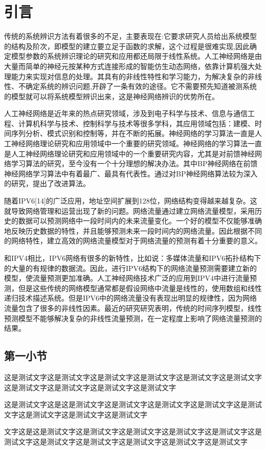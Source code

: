 \documentclass[UTF8]{ctexart}
\begin{document}
\tableofcontents\thispagestyle{empty}
\newpage
\setcounter{page}{1}
\section{引言}
传统的系统辨识方法有着很多的不足，主要表现在:它要求研究人员给出系统模型的结构及阶次，即模型的建立要立足于函数的求解，这个过程是很难实现,因此确定模型参数的系统辨识理论的研究和应用都还局限于线性系统。人工神经网络是由大量而简单的神经元按某种方式连接形成的智能仿生动态网络，依靠计算机强大处理能力来实现对信息的处理。其具有的非线性特性和学习能力，为解决复杂的非线性、不确定系统的辨识问题,开辟了一条有效的途径。它不需要预先知道被测系统的模型就可以将系统模型辨识出来，这是神经网络辨识的优势所在。

人工神经网络是近年来的热点研究领域，涉及到电子科学与技术、信息与通信工程、计算机科学与技术、控制科学与技术等很多学科，其应用领域包括：建模、时间序列分析、模式识别和控制等，并在不断的拓展。神经网络的学习算法一直是人工神经网络理论研究和应用领域中一个重要的研究领域。神经网络的学习算法一直是人工神经网络理论研究和应用领域中的一个重要研究内容，尤其是对前馈神经网络学习算法的研究，至今没有一个十分理想的解决办法。其中BP神经网络在前馈神经网络学习算法中有着最广、最具有代表性。通过对BP神经网络算法较为深入的研究，提出了改进算法。

随着IPV6[14]的广泛应用，地址空间扩展到128位，网络结构变得越来越复杂。这就导致网络管理和运营出现了新的问题。网络流量通过建立网络流量模型，采用历史的数据可以预测网络中一段时间内的未来流量变化。一个好的模型不仅能够准确地反映历史数据的特性，并且能够预测未来一段时间内的网络流量。因此根据不同的网络特性，建立高效的网络流量模型对于网络流量的预测有着十分重要的意义。

和IPV4相比，IPV6网络有很多的新特性，比如说：多媒体流量和IPV6拓扑结构下的大量的有规律的数据流。因此，进行IPV6结构下的网络流量预测需要建立新的模型，使流量预测更加准确。人工神经网络技术广泛的应用到IPV4中进行流量预测，但是这些传统的网络模型通常都是假设网络中流量是线性的，使用数组和线性递归技术描述系统。但是IPV6中的网络流量没有表现出明显的规律性，因为网络流量包含了很多的非线性因素。最近的研究研究表明，传统的时间序列模型，线性预测模型不能够解决复杂的非线性流量预测，在一定程度上影响了网络流量预测的结果。
\subsection{第一小节}
这是测试文字这是测试文字这是测试文字这是测试文字这是测试文字这是测试文字这是测试文字这是测试文字这是测试文字这是测试文字
\par 这是测试文字这是这是测试文字这是测试文字这是测试文字这是测试文字这是测试文字这是测试文字这是测试文字这是测试文字
\par 文字这是这是测试文字这是测试文字这是测试文字这是测试文字这是测试文字这是测试文字这是测试文字这是测试文字这是测试文字这是测试文字这是测试文字
\end{document}

